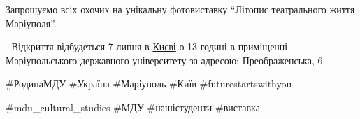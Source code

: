 Запрошуємо всіх охочих на унікальну  фотовиставку \enquote{Літопис театрального життя
Маріуполя}. 🤗

🏤 Відкриття відбудеться 7 липня в \href{\urlKyivIA}{Києві} о 13 годині в приміщенні
Маріупольського державного університету за адресою: Преображенська, 6.

\#РодинаМДУ  \#Україна \#Маріуполь \#Київ  \#futurestartswithyou

\#mdu\_cultural\_studies \#МДУ  \#нашістуденти \#виставка

